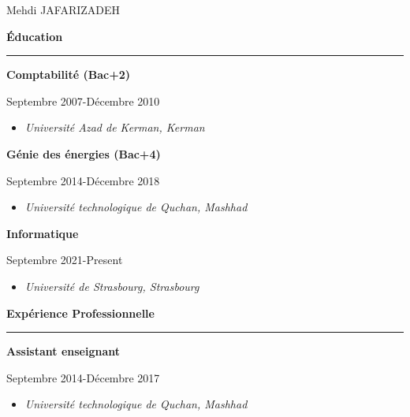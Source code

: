\documentclass{letter}
\newcommand{\divider}{\rule{\linewidth}{0.9pt}}
\begin{document}
\hfill
\begin{minipage}[t]{0.60\textwidth}


\setlength{\baselineskip}{1.5\baselineskip}
\vspace{0.7cm}

{\huge Mehdi JAFARIZADEH}

\vspace{1cm}


{\large \textbf{Éducation}}
\divider

{ \textbf{Comptabilité (Bac+2)}}

{\footnotesize Septembre 2007-Décembre 2010}
\begin{itemize}
    \footnotesize \item \textit{Université Azad de Kerman, Kerman}
\end{itemize}

\vspace{3mm}

{ \textbf{Génie des énergies (Bac+4)}}

{\footnotesize Septembre 2014-Décembre 2018}
\begin{itemize}
    \footnotesize \item \textit{Université technologique de Quchan, Mashhad}
\end{itemize}

\vspace{3mm}

{\textbf{Informatique}}

{\footnotesize Septembre 2021-Present}
\begin{itemize}
    \footnotesize \item \textit{Université de Strasbourg, Strasbourg}
\end{itemize}

\vspace{0.8cm}


{\large \textbf{Expérience Professionnelle}}
\divider

{ \textbf{Assistant enseignant}}

{ \footnotesize Septembre 2014-Décembre 2017}
\begin{itemize}
    \footnotesize \item \textit{Université technologique de Quchan, Mashhad}
\end{itemize}


\end{minipage}
\end{document}
